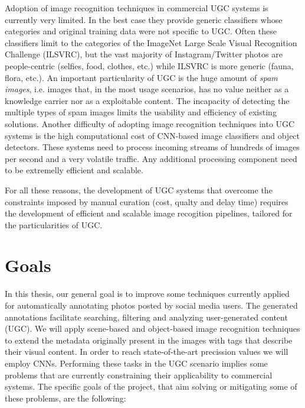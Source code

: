 Adoption of image recognition techniques in commercial UGC systems is currently very limited. In the best case they provide generic classifiers whose categories and original training data were not specific to UGC. Often these classifiers limit to the categories of the ImageNet Large Scale Visual Recognition Challenge (ILSVRC), but the vast majority of Instagram/Twitter photos are people-centric (selfies, food, clothes, etc.) while ILSVRC is more generic (fauna, flora, etc.). An important particularity of UGC is the huge amount of \textit{spam images}, i.e. images that, in the most usage scenarios, has no value neither as a knowledge carrier nor as a exploitable content. The incapacity of detecting the multiple types of spam images limits the usability and efficiency of existing solutions. Another difficulty of adopting image recognition techniques into UGC systems is the high computational cost of CNN-based image classifiers and object detectors. These systems need to process incoming streams of hundreds of images per second and a very volatile traffic. Any additional processing component need to be extremelly efficient and scalable. 

For all these reasons, the development of UGC systems that overcome the constraints imposed by manual curation (cost, qualty and delay time) requires the development of efficient and scalable image recogition pipelines, tailored for the particularities of UGC. 









\section{Goals} %


In this thesis, our general goal is to improve some techniques currently applied for automatically annotating photos posted by social media users. The generated annotations facilitate searching, filtering and analyzing user-generated content (UGC). We will apply scene-based and object-based image recognition techniques to extend the metadata originally present in the images with tags that describe their visual content. In order to reach state-of-the-art precission values we will employ CNNs. Performing these tasks in the UGC scenario implies some problems that are currently constraining their applicability to commercial systems. The specific goals of the project, that aim solving or mitigating some of these problems, are the following:

